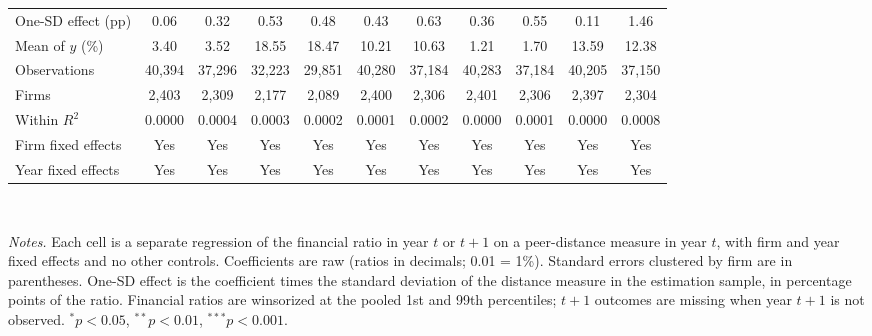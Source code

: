 \begin{landscape}
\begin{table}[H]
\begin{adjustbox}{max width=\linewidth, max totalheight=0.62\textheight}
\begin{tabular}{lcccccccccc}
One-SD effect (pp) & 0.06 & 0.32 & 0.53 & 0.48 & 0.43 & 0.63 & 0.36 & 0.55 & 0.11 & 1.46 \\
Mean of $y$ (\%) & 3.40 & 3.52 & 18.55 & 18.47 & 10.21 & 10.63 & 1.21 & 1.70 & 13.59 & 12.38 \\
Observations & 40,394 & 37,296 & 32,223 & 29,851 & 40,280 & 37,184 & 40,283 & 37,184 & 40,205 & 37,150 \\
Firms & 2,403 & 2,309 & 2,177 & 2,089 & 2,400 & 2,306 & 2,401 & 2,306 & 2,397 & 2,304 \\
Within $R^2$ & 0.0000 & 0.0004 & 0.0003 & 0.0002 & 0.0001 & 0.0002 & 0.0000 & 0.0001 & 0.0000 & 0.0008 \\
\midrule
Firm fixed effects & Yes & Yes & Yes & Yes & Yes & Yes & Yes & Yes & Yes & Yes \\
Year fixed effects & Yes & Yes & Yes & Yes & Yes & Yes & Yes & Yes & Yes & Yes \\
\bottomrule
\end{tabular}
\end{adjustbox}
\\[4pt]
\begin{minipage}{\linewidth}\footnotesize
\textit{Notes.} Each cell is a separate regression of the financial ratio in year $t$ or $t+1$ on a peer-distance measure in year $t$, with firm and year fixed effects and no other controls. Coefficients are raw (ratios in decimals; 0.01 = 1\%). Standard errors clustered by firm are in parentheses. One-SD effect is the coefficient times the standard deviation of the distance measure in the estimation sample, in percentage points of the ratio. Financial ratios are winsorized at the pooled 1st and 99th percentiles; $t+1$ outcomes are missing when year $t+1$ is not observed. $^{*}p<0.05$, $^{**}p<0.01$, $^{***}p<0.001$.
\end{minipage}
\end{table}
\end{landscape}
